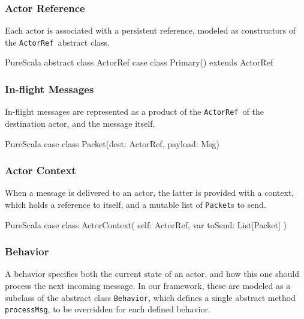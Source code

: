 \documentclass[a4paper,twoside]{article}
\newcommand{\InlineS}[1]{\lstinline[language=PureScala,basicstyle=\small\ttfamily,columns=fixed]|#1|}
\newcommand{\ActorRef}{\InlineS{ActorRef}\ }
\begin{document}
\vspace{-15pt}
\subsubsection*{Actor Reference}

Each actor is associated with a persistent reference, modeled as constructors of the \ActorRef abstract class.

\begin{ShortCode}{PureScala}
abstract class ActorRef
case class Primary() extends ActorRef
\end{ShortCode}

\vspace{-15pt}
\subsubsection*{In-flight Messages}

In-flight messages are represented as a product of the \ActorRef of the destination actor, and the message itself.

\begin{ShortCode}{PureScala}
case class Packet(dest: ActorRef, payload: Msg)
\end{ShortCode}

\vspace{-15pt}
\subsubsection*{Actor Context}

When a message is delivered to an actor, the latter is provided with a context,
which holds a reference to itself, and a mutable list of \InlineS{Packet}s to send.

\begin{ShortCode}{PureScala}
case class ActorContext(
  self: ActorRef,
  var toSend: List[Packet]
)
\end{ShortCode}

\vspace{-15pt}
\subsubsection*{Behavior}

A behavior specifies both the current state of an actor, and how this one should 
process the next incoming message. In our framework, these are modeled as a subclass 
of the abstract class \InlineS{Behavior}, which defines a single abstract method 
\InlineS{processMsg}, to be overridden for each defined behavior.
\end{document}
